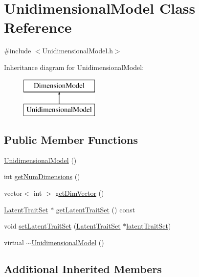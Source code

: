 \hypertarget{classUnidimensionalModel}{}\section{Unidimensional\+Model Class Reference}
\label{classUnidimensionalModel}


{\ttfamily \#include $<$Unidimensional\+Model.\+h$>$}

Inheritance diagram for Unidimensional\+Model\+:\begin{figure}[H]
\begin{center}
\leavevmode
\includegraphics[height=2.000000cm]{classUnidimensionalModel}
\end{center}
\end{figure}
\subsection*{Public Member Functions}
\begin{DoxyCompactItemize}
\item 
\hyperlink{classUnidimensionalModel_a7687f3972c99830c87722b2503ad0c0b}{Unidimensional\+Model} ()
\item 
int \hyperlink{classUnidimensionalModel_a98a0a8d59c3b7d770579dba0a14f4802}{get\+Num\+Dimensions} ()
\item 
vector$<$ int $>$ \hyperlink{classUnidimensionalModel_a31d345c00b118a0c9efdc36592d4edd1}{get\+Dim\+Vector} ()
\item 
\hyperlink{classLatentTraitSet}{Latent\+Trait\+Set} $\ast$ \hyperlink{classUnidimensionalModel_a1876249eafaaa89b145c50adc8b4745a}{get\+Latent\+Trait\+Set} () const 
\item 
void \hyperlink{classUnidimensionalModel_ab71959d21ff63f9d2fc15cf6a815b408}{set\+Latent\+Trait\+Set} (\hyperlink{classLatentTraitSet}{Latent\+Trait\+Set} $\ast$\hyperlink{classDimensionModel_af202cd5a44ee99d865674c6e26d770c8}{latent\+Trait\+Set})
\item 
virtual \hyperlink{classUnidimensionalModel_aa3004b4f2f2840ffabe9c1628bb2cc3e}{$\sim$\+Unidimensional\+Model} ()
\end{DoxyCompactItemize}
\subsection*{Additional Inherited Members}


